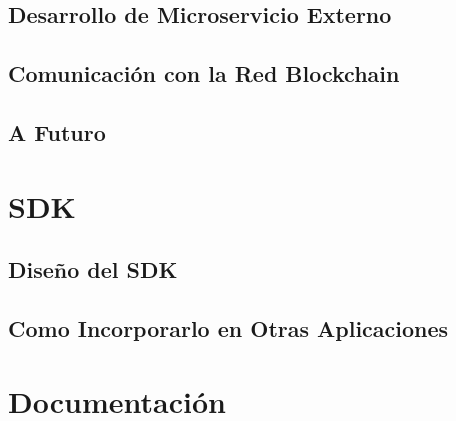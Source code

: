 \subsection{Desarrollo de Microservicio Externo}
\subsection{Comunicación con la Red Blockchain}
\subsection{A Futuro}



\section{SDK}
\subsection{Diseño del SDK}
\subsection{Como Incorporarlo en Otras Aplicaciones}



\section{Documentación}
